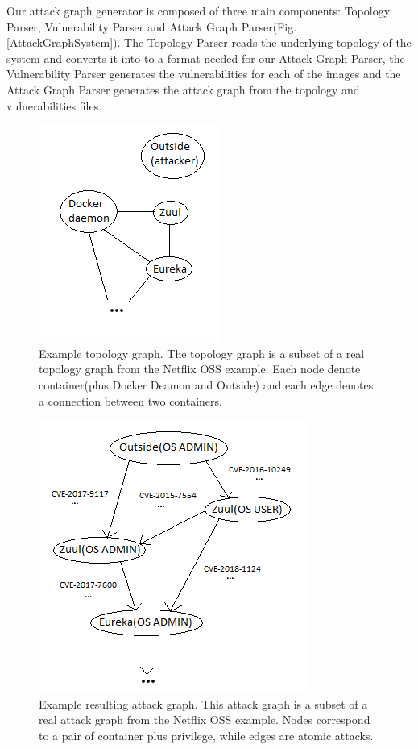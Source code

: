 \documentclass[letterpaper, 10 pt, conference]{ieeeconf}  %
\begin{document}
Our attack graph generator is composed of three main components: Topology Parser, Vulnerability Parser and Attack Graph Parser(Fig. \ref{AttackGraphSystem}). The Topology Parser reads the underlying topology of the system and converts it into to a format needed for our Attack Graph Parser, the Vulnerability Parser generates the vulnerabilities for each of the images and the Attack Graph Parser generates the attack graph from the topology and vulnerabilities files. 

\begin{figure}
	\includegraphics[]{Topology_graph}
	\caption{Example topology graph. The topology graph is a subset of a real topology graph from the Netflix OSS example. Each node denote container(plus Docker Deamon and Outside) and each edge denotes a connection between two containers.}
	\label{TopologyGraph}
\end{figure}

\begin{figure}
	\includegraphics[]{Attack_graph}
	\caption{Example resulting attack graph. This attack graph is a subset of a real attack graph from the Netflix OSS example. Nodes correspond to a pair of container plus privilege, while edges are atomic attacks.}
	\label{AttackGraph}
\end{figure}
\end{document}
